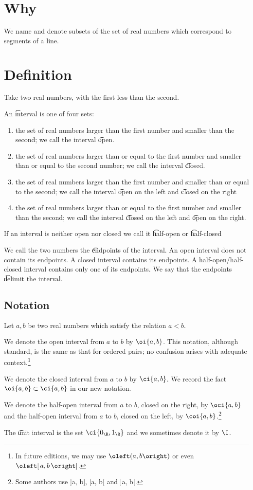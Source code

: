 

\section*{Why}

We name and denote subsets of the set of real numbers which correspond to segments of a line.

\section*{Definition}

Take two real numbers, with the first less than the second.

An \t{interval} is one of four sets:
    \begin{enumerate}
      \item the set of real numbers larger than the first number and smaller than the second; we call the interval \t{open}.
      \item the set of real numbers larger than or equal to the first number and smaller than or equal to the second number; we call the interval \t{closed}.
      \item the set of real numbers larger than the first number and smaller than or equal to the second; we call the interval \t{open on the left} and \t{closed on the right}
      \item the set of real numbers larger than or equal to the first number and smaller than the second; we call the interval \t{closed on the left} and \t{open on the right}.
    \end{enumerate}
If an interval is neither open nor closed we call it \t{half-open} or \t{half-closed}

We call the two numbers the \t{endpoints} of the interval.
An open interval does not contain its endpoints.
A closed interval contains its endpoints.
A half-open/half-closed interval contains only one of its endpoints.
We say that the endpoints \t{delimit} the interval.

\subsection*{Notation}

Let $a, b$ be two real numbers which satisfy the relation $a < b$.

We denote the open interval from $a$ to $b$ by $\oi{a, b}$.
This notation, although standard, is the same as that for ordered pairs; no confusion arises with adequate context.\footnote{In future editions, we may use $\oleft(a, b\oright)$ or even $\oleft[\,a, b\,\oright]$.}

We denote the closed interval from $a$ to $b$ by $\ci{a, b}$.
We record the fact $\oi{a, b} \subset \ci{a, b}$ in our new notation.

We denote the half-open interval from $a$ to $b$, closed on the right, by $\oci{a, b}$ and the half-open interval from $a$ to $b$, closed on the left, by $\coi{a, b}$.\footnote{Some authors use ]a, b], [a, b[ and ]a, b[.}

The \t{unit interval} is the set $\ci{0_{\R }, 1_{\R }}$ and we sometimes denote it by $\I$.
